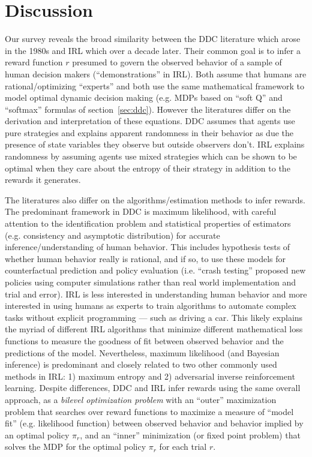 \section{Discussion\label{sec:conclusion}}

Our survey reveals the broad similarity between the DDC literature which arose in the 1980s and IRL which over a decade later.
Their common goal is to infer a reward function $r$ presumed to govern the observed
behavior of a sample of human decision makers (``demonstrations'' in IRL).  Both assume that humans are rational/optimizing ``experts''
and both use the same mathematical framework to model optimal dynamic decision making (e.g. MDPs based on ``soft Q'' and ``softmax'' formulas
of section~\ref{sec:ddc}). However the literatures differ on the derivation and interpretation of these equations.
DDC assumes that agents use pure strategies and explains apparent randomness in their behavior as due the presence of state variables they
observe but outside observers don't. IRL explains randomness by assuming agents use  mixed strategies
which can be shown to be optimal when they care about the entropy of their strategy in addition to the rewards it generates.

The literatures also differ on the algorithms/estimation methods to infer rewards.
The predominant framework in DDC is maximum likelihood, with careful attention to the identification problem and statistical properties
of estimators (e.g. consistency and asymptotic distribution) for accurate inference/understanding of human behavior. This includes hypothesis tests of
whether human behavior really is rational, and if so, to use these models for counterfactual prediction and policy evaluation (i.e. ``crash testing''
proposed new policies using computer simulations rather than real world implementation and trial and error).
IRL is less interested in understanding
human behavior and more interested in using humans as experts to train algorithms to automate complex tasks without explicit programming --- such as driving a car.
This likely explains the myriad of different IRL algorithms that minimize different mathematical loss functions to measure the goodness of
fit between observed behavior and the predictions of the model. Nevertheless, maximum likelihood (and Bayesian inference) is
predominant and closely related to two other commonly used methods in IRL: 1) maximum entropy
and  2) adversarial inverse reinforcement learning.
Despite differences, DDC and IRL infer rewards using the same overall approach, as a  {\it bilevel optimization problem\/}
with an ``outer'' maximization problem that searches over reward functions to maximize a measure of ``model fit'' (e.g. likelihood
function) between observed behavior and behavior implied
by an optimal policy $\pi_r$, and an ``inner'' minimization
(or fixed point problem) that solves the MDP for the optimal policy $\pi_r$ for each trial $r$.

